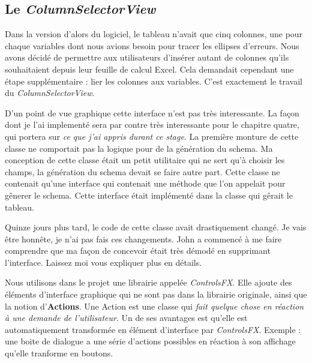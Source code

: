 \subsection{Le \textit{ColumnSelectorView}}
Dans la version d'alors du logiciel, le tableau n'avait que cinq colonnes, une pour chaque variables dont nous avions besoin pour tracer les ellipses d'erreurs. Nous avons décidé de permettre aux utilisateurs d'insérer autant de colonnes qu'ils souhaitaient depuis leur feuille de calcul Excel. Cela demandait cependant une étape supplémentaire : lier les colonnes aux variables. C'est exactement le travail du \textit{ColumnSelectorView}.


D'un point de vue graphique cette interface n'est pas très interessante. La façon dont je l'ai implementé sera par contre très interessante pour le chapitre quatre, qui portera sur \textit{ce que j'ai appris durant ce stage}. La première monture de cette classe ne comportait pas la logique pour de la génération du schema. Ma conception de cette classe était un petit utilitaire qui ne sert qu'à choisir les champs, la génération du schema devait se faire autre part. Cette classe ne contenait qu'une interface qui contenait une méthode que l'on appelait pour gênerer le schema. Cette interface était implémenté dans la classe qui gêrait le tableau.


Quinze jours plus tard, le code de cette classe avait drastiquement changé. Je vais être honnête, je n'ai pas fais ces changements. John a commencé à me faire comprendre que ma façon de concevoir était très démodé en supprimant l'interface. Laissez moi vous expliquer plus en détails.

Nous utilisons dans le projet une librairie appelée \textit{ControlsFX}. Elle ajoute des éléments d'interface graphique qui ne sont pas dans la librairie originale, ainsi que la notion d'\textbf{Actions}. Une Action est une classe qui \textit{fait quelque chose en réaction à une demande de l'utilisateur}.  Un de ses avantages est qu'elle est automatiquement transformée en élément d'interface par \textit{ControlsFX}. Exemple : une boite de dialogue a une série d'actions possibles en réaction à son affichage qu'elle tranforme en boutons.